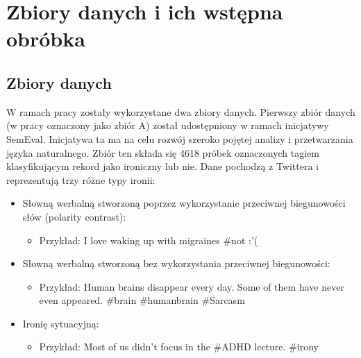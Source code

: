 \newpage %
\section{Zbiory danych i ich wstępna obróbka} \label{dane_wejsciowe}
\subsection{Zbiory danych} \label{dane_wejsciowe}



W ramach pracy zostały wykorzystane dwa zbiory danych. Pierwszy zbiór danych (w pracy oznaczony jako zbiór A) został udostępniony w ramach inicjatywy SemEval. Inicjatywa ta ma na celu rozwój szeroko pojętej analizy i przetwarzania języka naturalnego. Zbiór ten składa się 4618 próbek oznaczonych tagiem klasyfikującym rekord jako ironiczny lub nie. Dane pochodzą z Twittera i reprezentują trzy różne typy ironii:
\begin{itemize}
    \item Słowną werbalną stworzoną poprzez wykorzystanie przeciwnej biegunowości słów (polarity contrast):
          \begin{itemize}
              \item Przykład: I love waking up with migraines \#not :'(
          \end{itemize}

    \item Słowną werbalną stworzoną bez wykorzystania przeciwnej biegunowości:
          \begin{itemize}
              \item Przykład: Human brains disappear every day. Some of them have never even appeared. \#brain \#humanbrain \#Sarcasm
          \end{itemize}

    \item Ironię sytuacyjną:
          \begin{itemize}
              \item Przykład: Most of us didn't focus in the \#ADHD lecture. \#irony
          \end{itemize}
\end{itemize}

